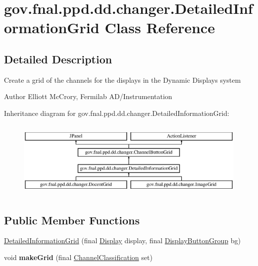 \hypertarget{classgov_1_1fnal_1_1ppd_1_1dd_1_1changer_1_1DetailedInformationGrid}{\section{gov.\-fnal.\-ppd.\-dd.\-changer.\-Detailed\-Information\-Grid Class Reference}
\label{classgov_1_1fnal_1_1ppd_1_1dd_1_1changer_1_1DetailedInformationGrid}
}


\subsection{Detailed Description}
Create a grid of the channels for the displays in the Dynamic Displays system

\begin{DoxyAuthor}{Author}
Elliott Mc\-Crory, Fermilab A\-D/\-Instrumentation 
\end{DoxyAuthor}
Inheritance diagram for gov.\-fnal.\-ppd.\-dd.\-changer.\-Detailed\-Information\-Grid\-:\begin{figure}[H]
\begin{center}
\leavevmode
\includegraphics[height=3.783784cm]{classgov_1_1fnal_1_1ppd_1_1dd_1_1changer_1_1DetailedInformationGrid}
\end{center}
\end{figure}
\subsection*{Public Member Functions}
\begin{DoxyCompactItemize}
\item 
\hyperlink{classgov_1_1fnal_1_1ppd_1_1dd_1_1changer_1_1DetailedInformationGrid_ab24503e5e35e12bd5b9a597ce745b693}{Detailed\-Information\-Grid} (final \hyperlink{interfacegov_1_1fnal_1_1ppd_1_1dd_1_1signage_1_1Display}{Display} display, final \hyperlink{classgov_1_1fnal_1_1ppd_1_1dd_1_1util_1_1specific_1_1DisplayButtonGroup}{Display\-Button\-Group} bg)
\item 
\hypertarget{classgov_1_1fnal_1_1ppd_1_1dd_1_1changer_1_1DetailedInformationGrid_a5bd425b13017a5bb4ca36f663d2f966f}{void {\bfseries make\-Grid} (final \hyperlink{classgov_1_1fnal_1_1ppd_1_1dd_1_1changer_1_1ChannelClassification}{Channel\-Classification} set)}\label{classgov_1_1fnal_1_1ppd_1_1dd_1_1changer_1_1DetailedInformationGrid_a5bd425b13017a5bb4ca36f663d2f966f}

\end{DoxyCompactItemize}
